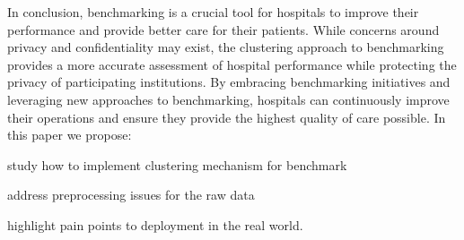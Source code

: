 In conclusion, benchmarking is a crucial tool for hospitals to improve their performance and provide better care for their patients. While concerns around privacy and confidentiality may exist, the clustering approach to benchmarking provides a more accurate assessment of hospital performance while protecting the privacy of participating institutions. By embracing benchmarking initiatives and leveraging new approaches to benchmarking, hospitals can continuously improve their operations and ensure they provide the highest quality of care possible.
In this paper we propose:
\begin{myitemize}
    \item study how to implement clustering mechanism for benchmark
    \item address preprocessing issues for the raw data
    \item highlight pain points to deployment in the real world.
\end{myitemize}